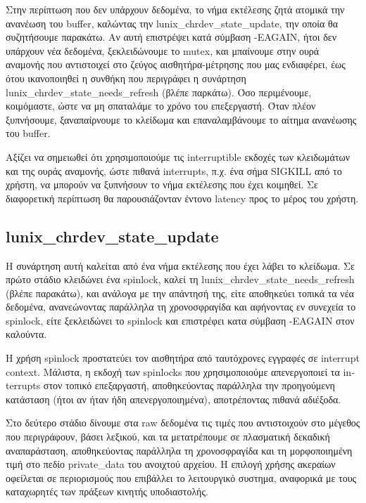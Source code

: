\documentclass[12pt,titlepage]{article}
\begin{document}
Στην περίπτωση που δεν υπάρχουν δεδομένα, το νήμα εκτέλεσης ζητά ατομικά την ανανέωση του \textlatin{buffer}, καλώντας την \textlatin{lunix\_chrdev\_state\_update}, την οποία θα συζητήσουμε παρακάτω. Αν αυτή επιστρέψει κατά σύμβαση \textlatin{-EAGAIN}, ήτοι δεν υπάρχουν νέα δεδομένα, ξεκλειδώνουμε το \textlatin{mutex}, και μπαίνουμε στην ουρά αναμονής που αντιστοιχεί στο ζεύγος αισθητήρα-μέτρησης που μας ενδιαφέρει, έως ότου ικανοποιηθεί η συνθήκη που περιγράφει η συνάρτηση \textlatin{lunix\_chrdev\_state\_needs\_refresh} (βλέπε παρκάτω). Όσο περιμένουμε, κοιμόμαστε, ώστε να μη σπαταλάμε το χρόνο του επεξεργαστή. Όταν πλέον ξυπνήσουμε, ξαναπαίρνουμε το κλείδωμα και επαναλαμβάνουμε το αίτημα ανανέωσης του \textlatin{buffer}.

Αξίζει να σημειωθεί ότι χρησιμοποιούμε τις \textlatin{interruptible} εκδοχές των κλειδωμάτων και της ουράς αναμονής, ώστε πιθανά \textlatin{interrupts}, π.χ. ένα σήμα \textlatin{SIGKILL} από το χρήστη, να μπορούν να ξυπνήσουν το νήμα εκτέλεσης που έχει κοιμηθεί. Σε διαφορετική περίπτωση θα παρουσιάζονταν έντονο \textlatin{latency} προς το μέρος του χρήστη.

\subsection{\textlatin{lunix\_chrdev\_state\_update}}

Η συνάρτηση αυτή καλείται από ένα νήμα εκτέλεσης που έχει λάβει το κλείδωμα. Σε πρώτο στάδιο κλειδώνει ένα \textlatin{spinlock}, καλεί τη \textlatin{lunix\_chrdev\_state\_needs\_refresh} (βλέπε παρακάτω), και ανάλογα με την απάντησή της, είτε αποθηκεύει τοπικά τα νέα δεδομένα, ανανεώνοντας παράλληλα τη χρονοσφραγίδα και αφήνοντας εν συνεχεία το \textlatin{spinlock}, είτε ξεκλειδώνει το \textlatin{spinlock} και επιστρέφει κατα σύμβαση \textlatin{-EAGAIN} στον καλούντα.

Η χρήση \textlatin{spinlock} προστατεύει τον αισθητήρα από ταυτόχρονες εγγραφές σε \textlatin{interrupt context}. Μάλιστα, η εκδοχή των \textlatin{spinlocks} που χρησιμοποιούμε απενεργοποιεί τα \textlatin{interrupts} στον τοπικό επεξαργαστή, αποθηκεύοντας παράλληλα την προηγούμενη κατάσταση (ήτοι αν ήταν ήδη απενεργοποιημένα), αποτρέποντας πιθανά αδιέξοδα.

Στο δεύτερο στάδιο δίνουμε στα \textlatin{raw} δεδομένα τις τιμές που αντιστοιχούν στο μέγεθος που περιγράφουν, βάσει λεξικού, και τα μετατρέπουμε σε πλασματική δεκαδική αναπαράσταση, αποθηκεύοντας παράλληλα τη χρονοσφραγίδα και τη μορφοποιημένη τιμή στο πεδίο \textlatin{private\_data} του ανοιχτού αρχείου. Η επιλογή χρήσης ακεραίων οφείλεται σε περιορισμούς που επιβάλλει το λειτουργικό συστημα, αναφορικά με τους καταχωρητές των πράξεων κινητής υποδιαστολής. 
\end{document}
